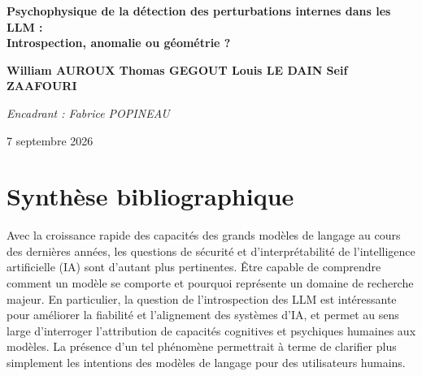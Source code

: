 \documentclass[10pt,a4paper]{article}
\begin{document}
\begin{center}
  \vspace*{8pt}
  {\LARGE\bfseries Psychophysique de la détection des perturbations internes dans les LLM :\\[-1pt]
  Introspection, anomalie ou géométrie ?\par}
  \vspace{10pt}
  {\normalsize\bfseries William AUROUX \hspace{1.3em} Thomas GEGOUT \hspace{1.3em} Louis LE DAIN \hspace{1.3em} Seif ZAAFOURI\par}
  \vspace{4pt}
  {\small\itshape Encadrant : Fabrice POPINEAU\par}
  \vspace{3pt}
  {\small 7 septembre 2026\par}
\end{center}

\vspace{5pt}
\section*{Synthèse bibliographique}

Avec la croissance rapide des capacités des grands modèles de langage au cours des dernières années, les questions de sécurité et d'interprétabilité de l'intelligence artificielle (IA) sont d'autant plus pertinentes. Être capable de comprendre comment un modèle se comporte et pourquoi représente un domaine de recherche majeur. En particulier, la question de l'introspection des LLM est intéressante pour améliorer la fiabilité et l'alignement des systèmes d'IA, et permet au sens large d'interroger l'attribution de capacités cognitives et psychiques humaines aux modèles. La présence d'un tel phénomène permettrait à terme de clarifier plus simplement les intentions des modèles de langage pour des utilisateurs humains.
\end{document}
